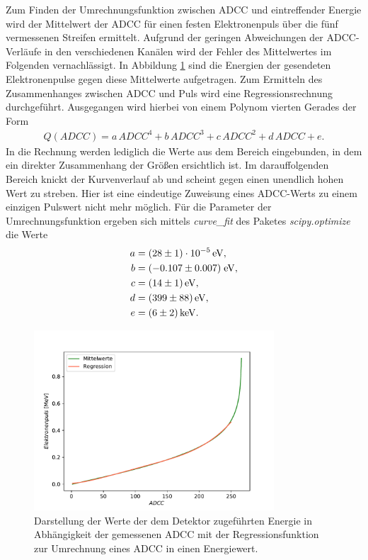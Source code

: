 Zum Finden der Umrechnungsfunktion zwischen ADCC und eintreffender Energie wird der Mittelwert der ADCC für einen festen Elektronenpuls über die fünf vermessenen Streifen ermittelt. Aufgrund der geringen Abweichungen der ADCC-Verläufe in den verschiedenen Kanälen wird der Fehler des Mittelwertes im Folgenden vernachlässigt. In Abbildung \ref{fig:Regression} sind die Energien der gesendeten Elektronenpulse gegen diese Mittelwerte aufgetragen. Zum Ermitteln des Zusammenhanges zwischen ADCC und Puls wird eine Regressionsrechnung durchgeführt. Ausgegangen wird hierbei von einem Polynom vierten Gerades der Form
\begin{align}
  Q(ADCC) = a\,ADCC^4 + b\,ADCC^3 + c\,ADCC^2 + d\,ADCC + e.
  \label{eq:Kalib}
\end{align}
In die Rechnung werden lediglich die Werte aus dem Bereich eingebunden, in dem ein direkter Zusammenhang der Größen ersichtlich ist. Im darauffolgenden Bereich knickt der Kurvenverlauf ab und scheint gegen einen unendlich hohen Wert zu streben. Hier ist eine eindeutige Zuweisung eines ADCC-Werts zu einem einzigen Pulswert nicht mehr möglich.
Für die Parameter der Umrechnungsfunktion ergeben sich mittels \textit{curve\_fit} des Paketes \textit{scipy.optimize} die Werte
\begin{align*}
  a &= \SI{28 (1)e-5}{\electronvolt},\\
  b &= (-0.107 \pm 0.007) \; \si{\electronvolt},\\
  c &= \SI{14(1)}{\electronvolt},\\
  d &= \SI{399(88)}{\electronvolt},\\
  e &= \SI{6(2)}{k\electronvolt}.
\end{align*}

\begin{figure}
  \centering
  \includegraphics[width=0.8\textwidth]{plots/Kalibrationsregression.pdf}
  \caption{Darstellung der Werte der dem Detektor zugeführten Energie in Abhängigkeit der gemessenen ADCC mit der Regressionsfunktion zur Umrechnung eines ADCC in einen Energiewert.}
  \label{fig:Regression}
\end{figure}
\FloatBarrier

